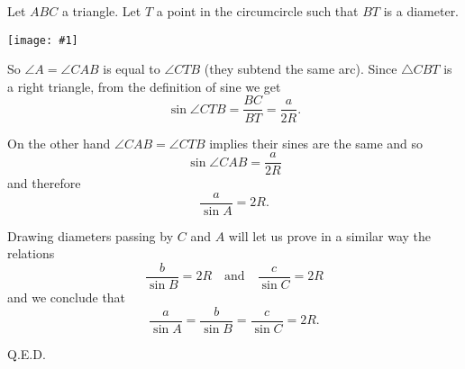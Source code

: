 \documentclass[12pt]{article}
\newcommand{\figura}[1]{\begin{center}\texttt{[image: \#1]}\end{center}}
\begin{document}
Let $ABC$ a triangle. Let $T$ a point in the circumcircle such that $BT$ is a diameter. 
\figura{sineslawproof}

So $\angle A=\angle CAB$ is equal to $\angle CTB$ (they subtend the same arc). Since $\triangle CBT$ is a right triangle, from the definition of sine we get
$$\sin \angle CTB =\frac{BC}{BT}=\frac{a}{2R}.$$

On the other hand $\angle CAB=\angle CTB$ implies their sines are the same and so
$$\sin \angle CAB=\frac{a}{2R}$$
and therefore
$$\frac{a}{\sin A}=2R.$$

Drawing diameters passing by $C$ and $A$ will let us prove in a similar way the relations
$$\frac{b}{\sin B}=2R\quad\mbox{and}\quad\frac{c}{\sin C}=2R$$
and we conclude that $$\frac{a}{\sin A}=\frac{b}{\sin B}=\frac{c}{\sin C}=2R.$$

Q.E.D.
\end{document}
